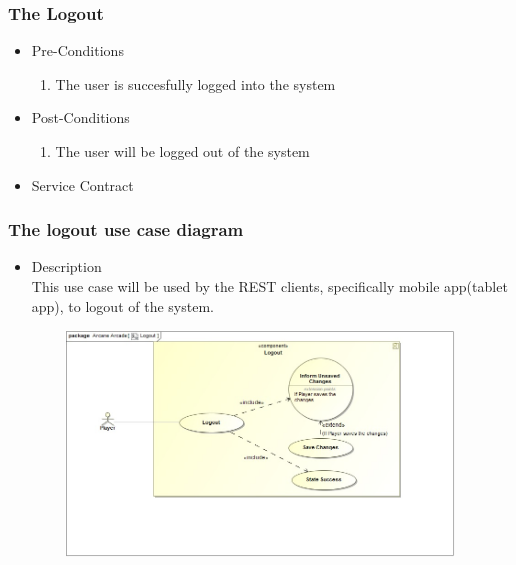 \documentclass[english]{article}
\begin{document}
				\subsubsection{The Logout}
		\begin{itemize}
	
		
		\item Pre-Conditions
			\begin{enumerate}
				\item The user is succesfully logged into the system 
			
			\end{enumerate}
		\item Post-Conditions
			\begin{enumerate}
			\item The user will be logged out of the system
						
			\end{enumerate}
		\item Service Contract
			\begin{figure}
			
			\end{figure}

\end{itemize}

		\subsubsection* {The logout use case diagram}
		\begin{itemize}
			\item Description\\
			This use case will be used by the REST clients, specifically mobile app(tablet app), to logout of the system.
		\end{itemize}
		
	
		\includegraphics[width=14cm,height=6cm,keepaspectratio]{logOut.jpg}
		
\end{document}
